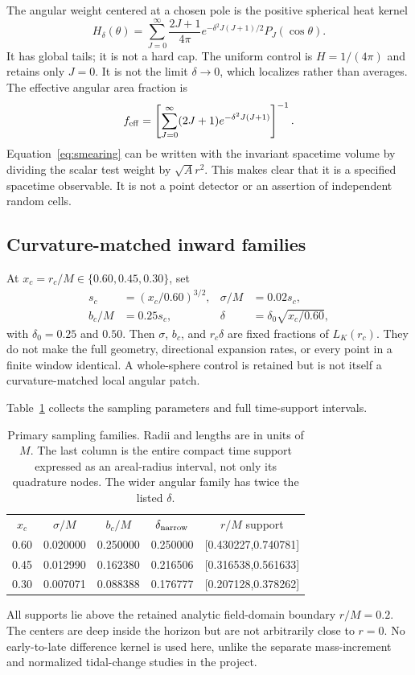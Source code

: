 \documentclass[aps,prd,reprint,floatfix,nofootinbib,longbibliography]{revtex4-2}
\newcommand{\Lc}{L_{\!K}}
\begin{document}
The angular weight centered at a chosen pole is the positive spherical heat kernel
\begin{equation}
 H_\delta(\theta)=\sum_{J=0}^{\infty}\frac{2J+1}{4\pi}
       e^{-\delta^2J(J+1)/2}P_J(\cos\theta).
 \label{eq:heat}
\end{equation}
It has global tails; it is not a hard cap. The uniform control is $H=1/(4\pi)$ and retains only $J=0$. It is not the limit $\delta\to0$, which localizes rather than averages. The effective angular area fraction is
\begin{equation}
 f_{\rm eff}=\left[\sum_{J=0}^{\infty}(2J+1)e^{-\delta^2J(J+1)}\right]^{-1}.
 \label{eq:area}
\end{equation}
Equation~\eqref{eq:smearing} can be written with the invariant spacetime volume by dividing the scalar test weight by $\sqrt{A}r^2$. This makes clear that it is a specified spacetime observable. It is not a point detector or an assertion of independent random cells.

\subsection{Curvature-matched inward families}
At $x_c=r_c/M\in\{0.60,0.45,0.30\}$, set
\begin{align}
 s_c&=(x_c/0.60)^{3/2}, &\sigma/M&=0.02s_c,\nonumber\\
 b_c/M&=0.25s_c, &\delta&=\delta_0\sqrt{x_c/0.60},
 \label{eq:scales}
\end{align}
with $\delta_0=0.25$ and $0.50$. Then $\sigma$, $b_c$, and $r_c\delta$ are fixed fractions of $\Lc(r_c)$. They do not make the full geometry, directional expansion rates, or every point in a finite window identical. A whole-sphere control is retained but is not itself a curvature-matched local angular patch.

Table~\ref{tab:sampling} collects the sampling parameters and full time-support intervals.

\begin{table}[tb]
\caption{Primary sampling families. Radii and lengths are in units of $M$. The last column is the entire compact time support expressed as an areal-radius interval, not only its quadrature nodes. The wider angular family has twice the listed $\delta$.}
\label{tab:sampling}
\begin{ruledtabular}
\begin{tabular}{ccccc}
$x_c$&$\sigma/M$&$b_c/M$&$\delta_{\rm narrow}$&$r/M$ support\\
0.60&0.020000&0.250000&0.250000&[0.430227,0.740781]\\
0.45&0.012990&0.162380&0.216506&[0.316538,0.561633]\\
0.30&0.007071&0.088388&0.176777&[0.207128,0.378262]
\end{tabular}
\end{ruledtabular}
\end{table}
All supports lie above the retained analytic field-domain boundary $r/M=0.2$. The centers are deep inside the horizon but are not arbitrarily close to $r=0$. No early-to-late difference kernel is used here, unlike the separate mass-increment and normalized tidal-change studies in the project.
\end{document}
